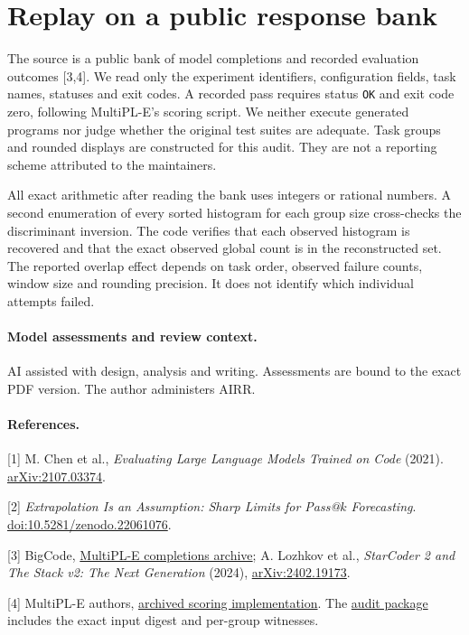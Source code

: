 \documentclass[11pt]{article}
\begin{document}
\newpage
\section{Replay on a public response bank}


The source is a public bank of model completions and recorded evaluation outcomes [3,4]. We read only the experiment identifiers, configuration fields, task names, statuses and exit codes. A recorded pass requires status \texttt{OK} and exit code zero, following MultiPL-E's scoring script. We neither execute generated programs nor judge whether the original test suites are adequate. Task groups and rounded displays are constructed for this audit. They are not a reporting scheme attributed to the maintainers.

All exact arithmetic after reading the bank uses integers or rational numbers. A second enumeration of every sorted histogram for each group size cross-checks the discriminant inversion. The code verifies that each observed histogram is recovered and that the exact observed global count is in the reconstructed set. The reported overlap effect depends on task order, observed failure counts, window size and rounding precision. It does not identify which individual attempts failed.

\paragraph{Model assessments and review context.} AI assisted with design, analysis and writing. Assessments are bound to the exact PDF version. The author administers AIRR.

\small
\paragraph{References.} [1] M. Chen et al., \emph{Evaluating Large Language Models Trained on Code} (2021). \href{https://arxiv.org/abs/2107.03374}{arXiv:2107.03374}.

[2] \emph{Extrapolation Is an Assumption: Sharp Limits for Pass@$k$ Forecasting}. \href{https://doi.org/10.5281/zenodo.22061076}{doi:10.5281/zenodo.22061076}.

[3] BigCode, \href{https://huggingface.co/datasets/bigcode/MultiPL-E-completions/tree/999e282fd3cad526dfe850e093ca671ed3dc5b43/data}{MultiPL-E completions archive}; A. Lozhkov et al., \emph{StarCoder 2 and The Stack v2: The Next Generation} (2024), \href{https://arxiv.org/abs/2402.19173}{arXiv:2402.19173}.

[4] MultiPL-E authors, \href{https://github.com/nuprl/MultiPL-E/blob/3025a531af7450e7df8b96fe0440e9804480bbad/pass_k.py}{archived scoring implementation}. The \href{https://github.com/lluiseriksson/THE-ERIKSSON-PROGRAMME/tree/codex/reintentos-ia-20261120/audits/rounded-retry-scores}{audit package} includes the exact input digest and per-group witnesses.
\end{document}
